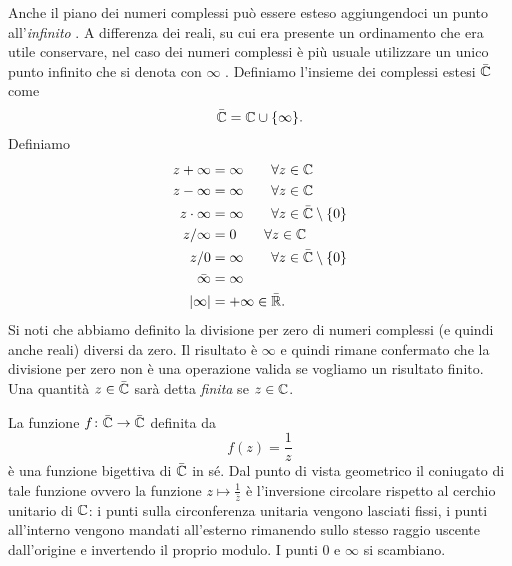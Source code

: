 Anche il piano dei numeri complessi può essere esteso aggiungendoci
un punto all'\emph{infinito}%
%
.
A differenza dei reali, su cui era presente un ordinamento che era utile conservare,
nel caso dei numeri complessi è più usuale utilizzare un unico punto infinito
che si denota con \emph{$\infty$}%
\mymargin{$\infty$}%
\index{$\infty$}.
Definiamo l'insieme dei complessi estesi $\bar {{\mathbb C}}$ come
\[
\bar {{\mathbb C}} = {\mathbb C} \cup {\left\{ \infty \right\}}.
\]
Definiamo
\begin{align*}
  z + \infty &= \infty \qquad \forall z \in {\mathbb C}\\
  z - \infty &= \infty \qquad \forall z \in {\mathbb C}\\
   z\cdot \infty &= \infty \qquad \forall z \in \bar{{\mathbb C}}\setminus{\left\{ 0 \right\}} \\
   z / \infty &= 0 \qquad \forall z \in {\mathbb C} \\
   z / 0 &= \infty \qquad \forall z \in \bar {{\mathbb C}} \setminus{\left\{ 0 \right\}}\\
   \bar \infty &= \infty \\
   {\left|\infty\right|} &= +\infty \in \bar {{\mathbb R}}.
\end{align*}
Si noti che abbiamo definito la divisione per zero di numeri complessi
(e quindi anche reali) diversi da zero. Il risultato è $\infty$ e quindi
rimane confermato che la divisione per zero non è una operazione valida
se vogliamo un risultato finito.
Una quantità $z\in \bar {{\mathbb C}}$ sarà detta \emph{finita} se $z\in {\mathbb C}$.

\begin{example}
  La funzione $f\colon \bar {{\mathbb C}} \to \bar {{\mathbb C}}$ 
  definita da 
  \[
  f(z) = \frac{1}{z}
  \]
  è una funzione bigettiva di $\bar {{\mathbb C}}$ in sé.
  Dal punto di vista geometrico il coniugato di tale funzione
  ovvero la funzione $z\mapsto \frac 1 {\bar z}$ 
  è l'inversione circolare rispetto al cerchio unitario di ${\mathbb C}$:
  i punti sulla circonferenza unitaria vengono lasciati fissi,
  i punti all'interno vengono mandati all'esterno rimanendo sullo 
  stesso raggio uscente dall'origine e invertendo il proprio modulo.
  I punti $0$ e $\infty$ si scambiano.
\end{example}


